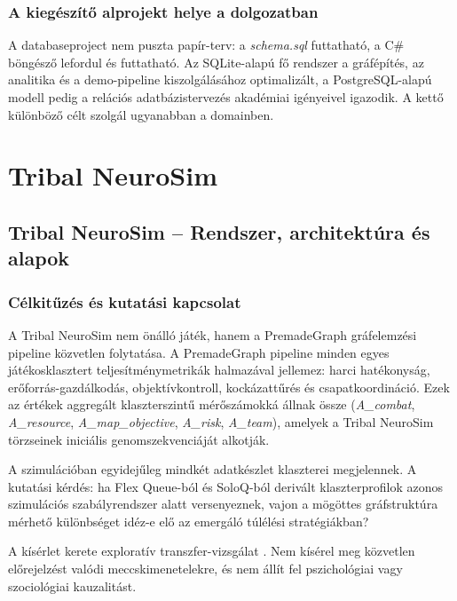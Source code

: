 \section{A kiegészítő alprojekt helye a dolgozatban}

A databaseproject nem puszta papír-terv: a \textit{schema.sql} futtatható, a C\# böngésző lefordul és futtatható. Az SQLite-alapú fő rendszer a gráfépítés, az analitika és a demo-pipeline kiszolgálásához optimalizált, a PostgreSQL-alapú modell pedig a relációs adatbázistervezés akadémiai igényeivel igazodik. A kettő különböző célt szolgál ugyanabban a domainben.

\part{Tribal NeuroSim}

\chapter{Tribal NeuroSim -- Rendszer, architektúra és alapok}

\section{Célkitűzés és kutatási kapcsolat}

A Tribal NeuroSim nem önálló játék, hanem a PremadeGraph gráfelemzési pipeline közvetlen folytatása. A PremadeGraph pipeline minden egyes játékosklasztert teljesítménymetrikák halmazával jellemez: harci hatékonyság, erőforrás-gazdálkodás, objektívkontroll, kockázattűrés és csapatkoordináció. Ezek az értékek aggregált klaszterszintű mérőszámokká állnak össze (\textit{A\_combat}, \textit{A\_resource}, \textit{A\_map\_objective}, \textit{A\_risk}, \textit{A\_team}), amelyek a Tribal NeuroSim törzseinek iniciális genomszekvenciáját alkotják.

A szimulációban egyidejűleg mindkét adatkészlet klaszterei megjelennek. A kutatási kérdés: ha Flex Queue-ból és SoloQ-ból derivált klaszterprofilok azonos szimulációs szabályrendszer alatt versenyeznek, vajon a mögöttes gráfstruktúra mérhető különbséget idéz-e elő az emergáló túlélési stratégiákban?

A kísérlet kerete exploratív transzfer-vizsgálat \cite{bonabeau2002}. Nem kísérel meg közvetlen előrejelzést valódi meccskimenetelekre, és nem állít fel pszichológiai vagy szociológiai kauzalitást.

